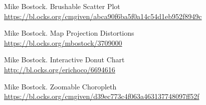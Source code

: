 \documentclass[journal]{vgtc}                %
\begin{document}
\begin{thebibliography}{9}
Mike Bostock.
Brushable Scatter Plot
\\\url{https://bl.ocks.org/cmgiven/abca90f6ba5f0a14c54d1eb952f8949c}

Mike Bostock.
Map Projection Distortions
\\\url{https://bl.ocks.org/mbostock/3709000}

Mike Bostock.
Interactive Donut Chart
\\\url{http://bl.ocks.org/erichoco/6694616}

Mike Bostock.
Zoomable Choropleth
\\\url{https://bl.ocks.org/cmgiven/d39ec773c4f063a463137748097ff52f}



\end{thebibliography}







%

%
%
%


\end{document}
